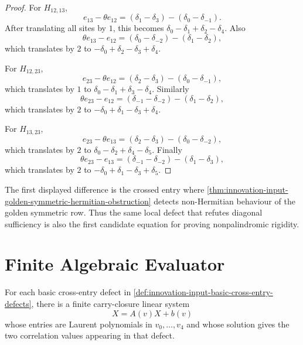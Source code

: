 \begin{proof}
For $H_{12,13}$,
$$
e_{13}-\theta e_{12}
=
(\delta_1-\delta_3)-(\delta_0-\delta_{-1}).
$$
After translating all sites by $1$, this becomes
$\delta_0-\delta_1+\delta_2-\delta_4$. Also
$$
\theta e_{13}-e_{12}
=
(\delta_0-\delta_{-2})-(\delta_1-\delta_2),
$$
which translates by $2$ to
$-\delta_0+\delta_2-\delta_3+\delta_4$.

For $H_{12,23}$,
$$
e_{23}-\theta e_{12}
=
(\delta_2-\delta_3)-(\delta_0-\delta_{-1}),
$$
which translates by $1$ to
$\delta_0-\delta_1+\delta_3-\delta_4$. Similarly
$$
\theta e_{23}-e_{12}
=
(\delta_{-1}-\delta_{-2})-(\delta_1-\delta_2),
$$
which translates by $2$ to
$-\delta_0+\delta_1-\delta_3+\delta_4$.

For $H_{13,23}$,
$$
e_{23}-\theta e_{13}
=
(\delta_2-\delta_3)-(\delta_0-\delta_{-2}),
$$
which translates by $2$ to
$\delta_0-\delta_2+\delta_4-\delta_5$. Finally
$$
\theta e_{23}-e_{13}
=
(\delta_{-1}-\delta_{-2})-(\delta_1-\delta_3),
$$
which translates by $2$ to
$-\delta_0+\delta_1-\delta_3+\delta_5$.
\end{proof}

\begin{principle}
\label{prin:innovation-input-golden-obstruction-entry}
The first displayed difference is the crossed entry where
\autoref{thm:innovation-input-golden-symmetric-hermitian-obstruction}
detects non-Hermitian behaviour of the golden symmetric row. Thus the
same local defect that refutes diagonal sufficiency is also the first
candidate equation for proving nonpalindromic rigidity.
\end{principle}

\section{Finite Algebraic Evaluator}
\label{sec:innovation-input-hermitian-finite-algebraic-evaluator}

\begin{proposition}
\label{prop:innovation-input-cross-entry-defects-finite-carry-form}
For each basic cross-entry defect in
\autoref{def:innovation-input-basic-cross-entry-defects}, there is a
finite carry-closure linear system
$$
X=A(v)X+b(v)
$$
whose entries are Laurent polynomials in $v_0,\ldots,v_4$ and whose
solution gives the two correlation values appearing in that defect.
\end{proposition}

